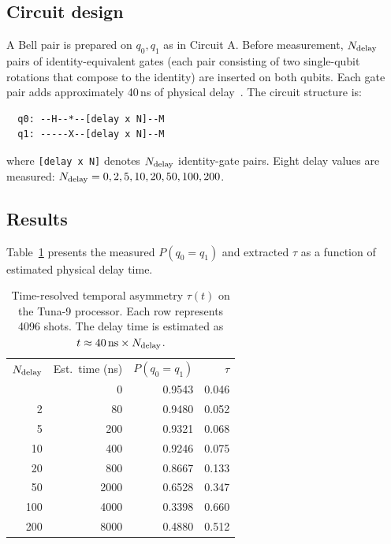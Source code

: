\documentclass[prl,twocolumn,superscriptaddress,longbibliography,floatfix]{revtex4-2}
\newcommand{\tauasym}{\tau}
\begin{document}
\subsection{Circuit design}

A Bell pair is prepared on $q_0,q_1$ as in Circuit A.  Before
measurement, $N_{\rm delay}$ pairs of identity-equivalent gates
(each pair consisting of two single-qubit rotations that compose to
the identity) are inserted on both qubits.  Each gate pair adds
approximately 40\,ns of physical delay~\cite{Tuna9}.  The circuit
structure is:
\begin{verbatim}
  q0: --H--*--[delay x N]--M
  q1: -----X--[delay x N]--M
\end{verbatim}
where {\tt [delay x N]} denotes $N_{\rm delay}$ identity-gate pairs.
Eight delay values are measured: $N_{\rm delay} = 0, 2, 5, 10,
20, 50, 100, 200$.

\subsection{Results}

Table~\ref{tab:birth} presents the measured $P(q_0{=}q_1)$ and
extracted $\tauasym$ as a function of estimated physical delay time.

\begin{table}[t]
\caption{\label{tab:birth}Time-resolved temporal asymmetry
$\tauasym(t)$ on the Tuna-9 processor. Each row represents 4096
shots. The delay time is estimated as
$t \approx 40\,\text{ns} \times N_{\rm delay}$.}
\begin{ruledtabular}
\begin{tabular}{rrrr}
$N_{\rm delay}$ & Est.\ time (ns) & $P(q_0{=}q_1)$ & $\tauasym$ \\
\colrule
0   &    0 & 0.9543 & 0.046 \\
2   &   80 & 0.9480 & 0.052 \\
5   &  200 & 0.9321 & 0.068 \\
10  &  400 & 0.9246 & 0.075 \\
20  &  800 & 0.8667 & 0.133 \\
50  & 2000 & 0.6528 & 0.347 \\
100 & 4000 & 0.3398 & 0.660 \\
200 & 8000 & 0.4880 & 0.512 \\
\end{tabular}
\end{ruledtabular}
\end{table}
\end{document}
